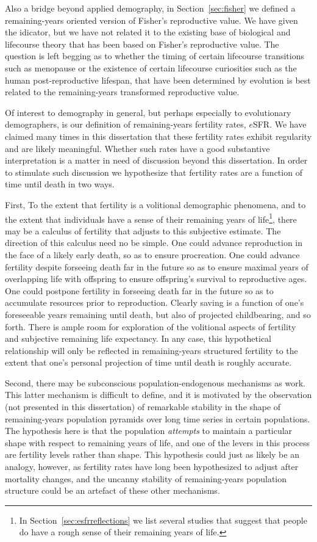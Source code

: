 Also a bridge beyond applied demography, in Section~\ref{sec:fisher} we
defined a remaining-years oriented version of Fisher's reproductive value. We
have given the idicator, but we have not related it to the existing base of
biological and lifecourse theory that has been based on Fisher's reproductive
value. The question is left begging as to whether the timing of certain
lifecourse transitions such as menopause or the existence of certain
lifecourse curiosities such as the human post-reproductive lifespan, that have
been determined by evolution is best related to the remaining-years transformed 
reproductive value. 

Of interest to demography in general, but perhaps especially to evolutionary
demographers, is our definition of remaining-years fertility rates, $e$SFR. We
have claimed many times in this dissertation that these fertility rates exhibit
regularity and are likely meaningful. Whether such rates have a good substantive
interpretation is a matter in need of discussion beyond this dissertation.
In order to stimulate such discussion we hypothesize that fertility rates are a
function of time until death in two ways. 

First, To the extent that fertility is
a volitional demographic phenomena, and to the extent that individuals have a
sense of their remaining years of life\footnote{In
Section~\ref{sec:esfrreflections} we list several studies that suggest that people do have a rough sense of their
remaining years of life.}, there may be a calculus of fertility that adjusts to
this subjective estimate. The direction of this calculus need no be simple. One
could advance reproduction in the face of a likely early death, so as to ensure
procreation. One could advance fertility despite forseeing death far in the
future so as to ensure maximal years of overlapping life with offspring to ensure 
offspring's survival to reproductive ages. One could postpone fertility in
forseeing death far in the future so as to accumulate resources prior to
reproduction. Clearly saving is a function of one's foreseeable years
remaining until death, but also of projected childbearing, and so forth. There
is ample room for exploration of the volitional aspects of fertility and
subjective remaining life expectancy. In any case, this hypothetical
relationship will only be reflected in remaining-years structured fertility to
the extent that one's personal projection of time until death is roughly
accurate. 

Second, there may be subconscious population-endogenous mechanisms as work. This
latter mechanism is difficult to define, and it is motivated by the observation
(not presented in this dissertation) of remarkable stability in the shape of
remaining-years population pyramids over long time series in certain
populations. The hypothesis here is that the population \textit{attempts} to 
maintain a particular shape with respect to remaining years of life, and one of
the levers in this process are fertility levels rather than shape. This
hypothesis could just as likely be an analogy, however, as fertility rates have
long been hypothesized to adjust after mortality changes, and the uncanny
stability of remaining-years population structure could be an artefact of these
other mechanisms. 

